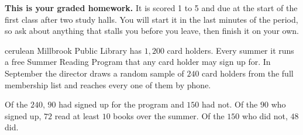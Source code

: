 \documentclass[12pt]{article}
\begin{document}

\vspace{0.12in}

\begin{remindbox}
\small
\textbf{This is your graded homework.} It is scored 1 to 5 and due at the start of the
first class after two study halls. You will start it in the last minutes of the period, so ask about anything that stalls
you before you leave, then finish it on your own.
\end{remindbox}

\vspace{0.08in}

\boxguard[20]
\begin{scenariobox}{cerulean}
Millbrook Public Library has $1{,}200$ card holders. Every summer it runs a free Summer
Reading Program that any card holder may sign up for. In September the director draws a
random sample of $240$ card holders from the full membership list and reaches every one of
them by phone.

\vspace{2pt}
Of the $240$, $90$ had signed up for the program and $150$ had not. Of the $90$ who signed
up, $72$ read at least $10$ books over the summer. Of the $150$ who did not, $48$ did.
\end{scenariobox}

\vspace{0.08in}
\end{document}
